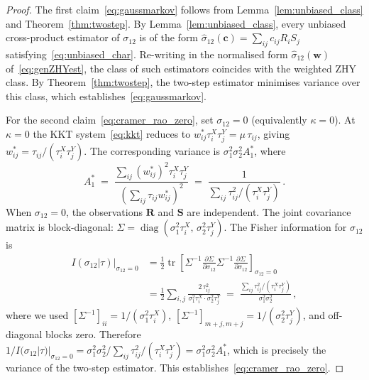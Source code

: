 \begin{proof}
The first claim~\eqref{eq:gaussmarkov} follows from
Lemma~\ref{lem:unbiased_class} and Theorem~\ref{thm:twostep}.
By Lemma~\ref{lem:unbiased_class}, every unbiased cross-product
estimator of $\sigma_{12}$ is of the form $\hat\sigma_{12}(\mathbf{c})
= \sum_{ij}c_{ij}R_iS_j$ satisfying~\eqref{eq:unbiased_char}.
Re-writing in the normalised form $\hat\sigma_{12}(\mathbf{w})$
of~\eqref{eq:genZHYest}, the class of such estimators coincides
with the weighted ZHY class.  By Theorem~\ref{thm:twostep}, the
two-step estimator minimises variance over this class, which
establishes~\eqref{eq:gaussmarkov}.

For the second claim~\eqref{eq:cramer_rao_zero}, set $\sigma_{12}=0$
(equivalently $\kappa=0$).  At $\kappa=0$ the KKT
system~\eqref{eq:kkt} reduces to $w_{ij}^*\tau_i^X\tau_j^Y
= \mu\,\tau_{ij}$, giving
$w_{ij}^* = \tau_{ij}/(\tau_i^X\tau_j^Y)$.  The corresponding
variance is $\sigma_1^2\sigma_2^2 A_1^*$, where
\begin{equation*}
    A_1^* \;=\; \frac{\displaystyle\sum_{ij}
                      (w_{ij}^*)^2\tau_i^X\tau_j^Y}
                     {\displaystyle\left(\sum_{ij}\tau_{ij}w_{ij}^*\right)^2}
             \;=\; \frac{1}{\displaystyle\sum_{ij}\tau_{ij}^2/(\tau_i^X\tau_j^Y)}\,.
\end{equation*}
When $\sigma_{12}=0$, the observations $\mathbf{R}$ and $\mathbf{S}$
are independent.  The joint covariance matrix is block-diagonal:
$\Sigma = \operatorname{diag}(\sigma_1^2\tau_i^X,\,\sigma_2^2\tau_j^Y)$.
The Fisher information for $\sigma_{12}$ is
\begin{align*}
    I(\sigma_{12}|\tau)\big|_{\sigma_{12}=0}
    &= \tfrac{1}{2}\operatorname{tr}\!\left[
        \Sigma^{-1}\frac{\partial\Sigma}{\partial\sigma_{12}}
        \Sigma^{-1}\frac{\partial\Sigma}{\partial\sigma_{12}}
       \right]_{\sigma_{12}=0} \\
    &= \tfrac{1}{2}\sum_{i,j}
       \frac{2\,\tau_{ij}^2}{\sigma_1^2\tau_i^X \cdot \sigma_2^2\tau_j^Y}
     \;=\; \frac{\displaystyle\sum_{ij}\tau_{ij}^2/(\tau_i^X\tau_j^Y)}
                {\sigma_1^2\sigma_2^2}\,,
\end{align*}
where we used $[\Sigma^{-1}]_{ii} = 1/(\sigma_1^2\tau_i^X)$,
$[\Sigma^{-1}]_{m+j,m+j} = 1/(\sigma_2^2\tau_j^Y)$,
and off-diagonal blocks zero.
Therefore $1/I(\sigma_{12}|\tau)|_{\sigma_{12}=0}
= \sigma_1^2\sigma_2^2/\sum_{ij}\tau_{ij}^2/(\tau_i^X\tau_j^Y)
= \sigma_1^2\sigma_2^2 A_1^*$,
which is precisely the variance of the two-step estimator.
This establishes~\eqref{eq:cramer_rao_zero}.
\end{proof}

